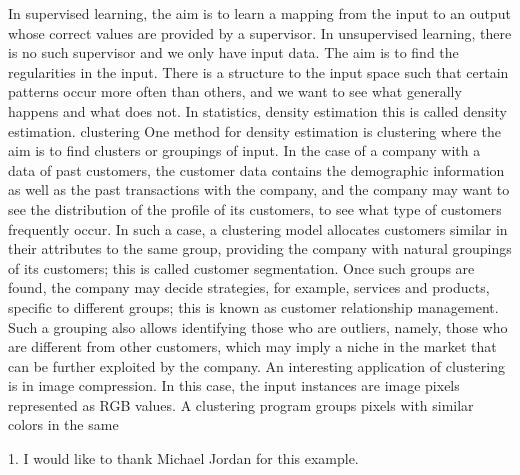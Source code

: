 In supervised learning, the aim is to learn a mapping from the input to an output whose correct values are provided by a supervisor. In unsupervised learning, there is no such supervisor and we only have input data. The aim is to find the regularities in the input. There is a structure to the input space such that certain patterns occur more often than others, and we want to see what generally happens and what does not. In statistics, density estimation this is called density estimation. clustering One method for density estimation is clustering where the aim is to find clusters or groupings of input. In the case of a company with a data of past customers, the customer data contains the demographic information as well as the past transactions with the company, and the company may want to see the distribution of the profile of its customers, to see what type of customers frequently occur. In such a case, a clustering model allocates customers similar in their attributes to the same group, providing the company with natural groupings of its customers; this is called customer segmentation. Once such groups are found, the company may decide strategies, for example, services and products, specific to different groups; this is known as customer relationship management. Such a grouping also allows identifying those who are outliers, namely, those who are different from other customers, which may imply a niche in the market that can be further exploited by the company. An interesting application of clustering is in image compression. In this case, the input instances are image pixels represented as RGB values. A clustering program groups pixels with similar colors in the same

1. I would like to thank Michael Jordan for this example.

